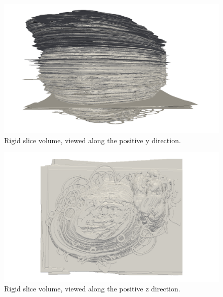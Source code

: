 	\begin{figure}
	  \centering
	  \includegraphics[width=0.9\textheight]{Ch7/Figs/Rat28/contours/whole_positive_y_rigid}
	  \caption{Rigid slice volume, viewed along the positive y direction.}
	  \label{fig:positive_y_rigid_contour}
	\end{figure}

	\begin{figure}
	  \centering
	  \includegraphics[width=0.9\textheight]{Ch7/Figs/Rat28/contours/whole_positive_z_rigid}
	  \caption{Rigid slice volume, viewed along the positive z direction.}
	  \label{fig:positive_z_rigid_contour}
	\end{figure}

